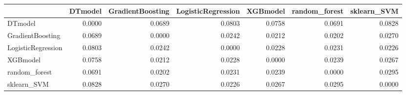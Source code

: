 \begin{tabular}{lrrrrrr}
\toprule
 & DTmodel & GradientBoosting & LogisticRegression & XGBmodel & random_forest & sklearn_SVM \\
\midrule
DTmodel & 0.0000 & 0.0689 & 0.0803 & 0.0758 & 0.0691 & 0.0828 \\
GradientBoosting & 0.0689 & 0.0000 & 0.0242 & 0.0212 & 0.0202 & 0.0270 \\
LogisticRegression & 0.0803 & 0.0242 & 0.0000 & 0.0228 & 0.0231 & 0.0226 \\
XGBmodel & 0.0758 & 0.0212 & 0.0228 & 0.0000 & 0.0239 & 0.0267 \\
random_forest & 0.0691 & 0.0202 & 0.0231 & 0.0239 & 0.0000 & 0.0295 \\
sklearn_SVM & 0.0828 & 0.0270 & 0.0226 & 0.0267 & 0.0295 & 0.0000 \\
\bottomrule
\end{tabular}

